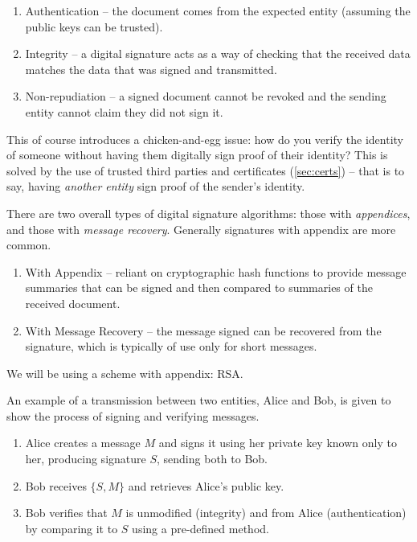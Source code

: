   \begin{enumerate}
    \item Authentication -- the document comes from the expected entity (assuming the public keys can be trusted).
    \item Integrity -- a digital signature acts as a way of checking that the received data matches the data that was signed and transmitted.
    \item Non-repudiation -- a signed document cannot be revoked and the sending entity cannot claim they did not sign it.
  \end{enumerate}
  
  This of course introduces a chicken-and-egg issue: how do you verify the identity of someone without having them digitally sign proof of their identity? This is solved by the use of trusted third parties and certificates (\textsection\ref{sec:certs}) -- that is to say, having \emph{another entity} sign proof of the sender's identity.
  
  There are two overall types of digital signature algorithms: those with \emph{appendices}, and those with \emph{message recovery}. Generally signatures with appendix are more common.
  
  \begin{enumerate}
    \item With Appendix -- reliant on cryptographic hash functions to provide message summaries that can be signed and then compared to summaries of the received document.
    \item With Message Recovery -- the message signed can be recovered from the signature, which is typically of use only for short messages.
  \end{enumerate}
  
  We will be using a scheme with appendix: RSA.
  
  An example of a transmission between two entities, Alice and Bob, is given to show the process of signing and verifying messages.
  
  \begin{enumerate}
    \item Alice creates a message $M$ and signs it using her private key known only to her, producing signature $S$, sending both to Bob.
    \item Bob receives $\{S,M\}$ and retrieves Alice's public key.
    \item Bob verifies that $M$ is unmodified (integrity) and from Alice (authentication) by comparing it to $S$ using a pre-defined method.
  \end{enumerate}
  
